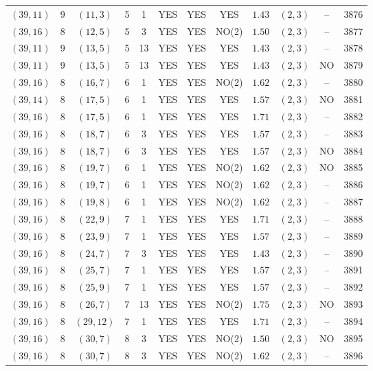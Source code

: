 \begin{longtable}{|c|c|c|c|c|c|c|c|c|c|c|c|}
$(39,11)$ & 9 & $(11,3)$ & 5 & 1 & YES & YES & YES & $1.43$ & $(2,3)$ & -- & 3876\\
$(39,16)$ & 8 & $(12,5)$ & 5 & 3 & YES & YES & NO(2) & $1.50$ & $(2,3)$ & -- & 3877\\
$(39,11)$ & 9 & $(13,5)$ & 5 & 13 & YES & YES & YES & $1.43$ & $(2,3)$ & -- & 3878\\
$(39,11)$ & 9 & $(13,5)$ & 5 & 13 & YES & YES & YES & $1.43$ & $(2,3)$ & NO & 3879\\
$(39,16)$ & 8 & $(16,7)$ & 6 & 1 & YES & YES & NO(2) & $1.62$ & $(2,3)$ & -- & 3880\\
$(39,14)$ & 8 & $(17,5)$ & 6 & 1 & YES & YES & YES & $1.57$ & $(2,3)$ & NO & 3881\\
$(39,16)$ & 8 & $(17,5)$ & 6 & 1 & YES & YES & YES & $1.71$ & $(2,3)$ & -- & 3882\\
$(39,16)$ & 8 & $(18,7)$ & 6 & 3 & YES & YES & YES & $1.57$ & $(2,3)$ & -- & 3883\\
$(39,16)$ & 8 & $(18,7)$ & 6 & 3 & YES & YES & YES & $1.57$ & $(2,3)$ & NO & 3884\\
$(39,16)$ & 8 & $(19,7)$ & 6 & 1 & YES & YES & NO(2) & $1.62$ & $(2,3)$ & NO & 3885\\
$(39,16)$ & 8 & $(19,7)$ & 6 & 1 & YES & YES & NO(2) & $1.62$ & $(2,3)$ & -- & 3886\\
$(39,16)$ & 8 & $(19,8)$ & 6 & 1 & YES & YES & NO(2) & $1.62$ & $(2,3)$ & -- & 3887\\
$(39,16)$ & 8 & $(22,9)$ & 7 & 1 & YES & YES & YES & $1.71$ & $(2,3)$ & -- & 3888\\
$(39,16)$ & 8 & $(23,9)$ & 7 & 1 & YES & YES & YES & $1.57$ & $(2,3)$ & -- & 3889\\
$(39,16)$ & 8 & $(24,7)$ & 7 & 3 & YES & YES & YES & $1.43$ & $(2,3)$ & -- & 3890\\
$(39,16)$ & 8 & $(25,7)$ & 7 & 1 & YES & YES & YES & $1.57$ & $(2,3)$ & -- & 3891\\
$(39,16)$ & 8 & $(25,9)$ & 7 & 1 & YES & YES & YES & $1.57$ & $(2,3)$ & -- & 3892\\
$(39,16)$ & 8 & $(26,7)$ & 7 & 13 & YES & YES & NO(2) & $1.75$ & $(2,3)$ & NO & 3893\\
$(39,16)$ & 8 & $(29,12)$ & 7 & 1 & YES & YES & YES & $1.71$ & $(2,3)$ & -- & 3894\\
$(39,16)$ & 8 & $(30,7)$ & 8 & 3 & YES & YES & NO(2) & $1.50$ & $(2,3)$ & NO & 3895\\
$(39,16)$ & 8 & $(30,7)$ & 8 & 3 & YES & YES & NO(2) & $1.62$ & $(2,3)$ & -- & 3896\\

\end{longtable}
